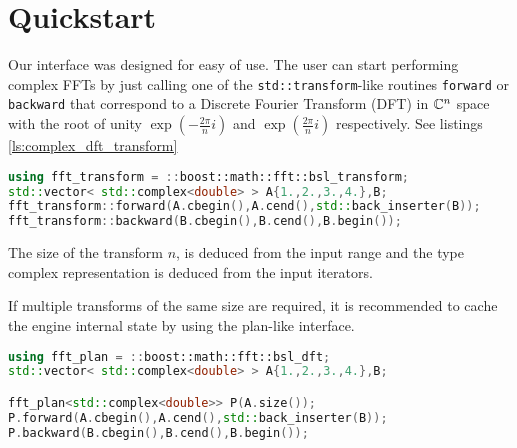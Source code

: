 \section{Quickstart}

Our interface was designed for easy of use. The user can start performing
complex FFTs by just calling one of the \texttt{std::transform}-like routines
\texttt{forward} or \texttt{backward} that correspond to a Discrete Fourier
Transform (DFT) in $\mathbb{C}^n$ space with the root of unity
$\exp(-\frac{2\pi}{n} i)$ and $\exp(\frac{2\pi}{n} i)$ respectively.
See listings \ref{ls:complex_dft_transform}
\begin{lstlisting}[language=C++,label=ls:complex_dft_transform,caption=Simple complex FFT
transform.]
using fft_transform = ::boost::math::fft::bsl_transform;
std::vector< std::complex<double> > A{1.,2.,3.,4.},B;
fft_transform::forward(A.cbegin(),A.cend(),std::back_inserter(B));
fft_transform::backward(B.cbegin(),B.cend(),B.begin());
\end{lstlisting}
The size of the transform $n$, is deduced from the input range and the type
complex representation is deduced from the input iterators.

If multiple transforms of the same size are required, it is recommended to cache
the engine internal state by using the plan-like interface.
\begin{lstlisting}[language=C++,label=ls:complex_dft_plan,caption=Simple complex FFT
Plan.]
using fft_plan = ::boost::math::fft::bsl_dft;
std::vector< std::complex<double> > A{1.,2.,3.,4.},B;

fft_plan<std::complex<double>> P(A.size());
P.forward(A.cbegin(),A.cend(),std::back_inserter(B));
P.backward(B.cbegin(),B.cend(),B.begin());
\end{lstlisting}
